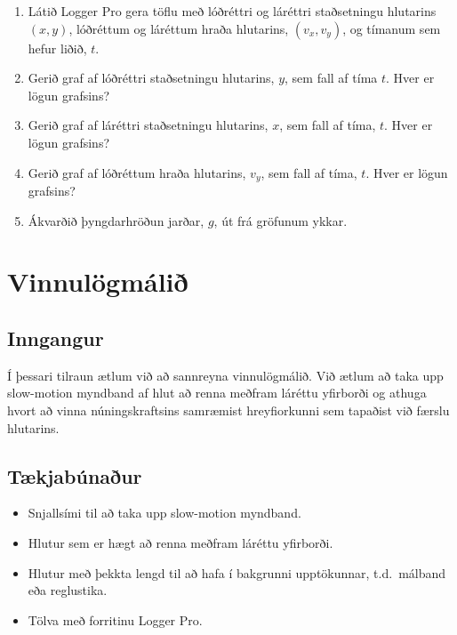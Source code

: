 \documentclass[oneside]{book}
\theoremstyle{definition}
\begin{document}
\begin{enumerate}[label = (\roman*)]
    \item Látið Logger Pro gera töflu með lóðréttri og láréttri staðsetningu hlutarins $(x,y)$, lóðréttum og láréttum hraða hlutarins, $(v_x, v_y)$, og tímanum sem hefur liðið, $t$.
    
    \item Gerið graf af lóðréttri staðsetningu hlutarins, $y$, sem fall af tíma $t$. Hver er lögun grafsins?
    
    \item Gerið graf af láréttri staðsetningu hlutarins, $x$, sem fall af tíma, $t$. Hver er lögun grafsins?
    
    \item Gerið graf af lóðréttum hraða hlutarins, $v_y$, sem fall af tíma, $t$. Hver er lögun grafsins?
    
    \item Ákvarðið þyngdarhröðun jarðar, $g$, út frá gröfunum ykkar.
\end{enumerate}

\newpage

\section{Vinnulögmálið}

\subsection*{Inngangur}

Í þessari tilraun ætlum við að sannreyna vinnulögmálið. Við ætlum að taka upp slow-motion myndband af hlut að renna meðfram láréttu yfirborði og athuga hvort að vinna núningskraftsins samræmist hreyfiorkunni sem tapaðist við færslu hlutarins.

\subsection*{Tækjabúnaður}

\begin{itemize}
    \item Snjallsími til að taka upp slow-motion myndband.
    
    \item Hlutur sem er hægt að renna meðfram láréttu yfirborði.
    
    \item Hlutur með þekkta lengd til að hafa í bakgrunni upptökunnar, t.d.~málband eða reglustika.
    
    \item Tölva með forritinu Logger Pro.
\end{itemize}
\end{document}
